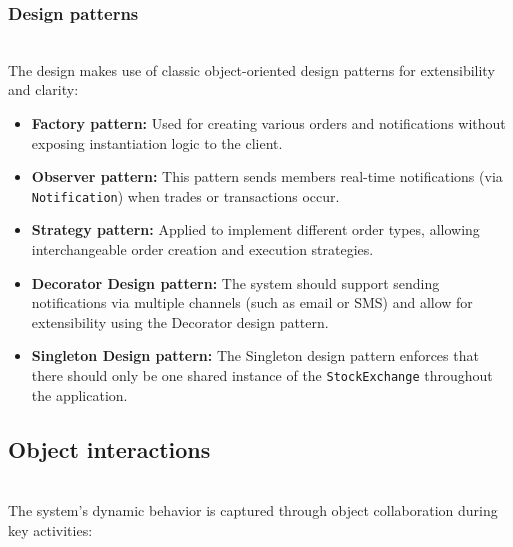 \subsubsection{Design patterns}\label{TQ2PkvirYm4pmg-iTSis4}
\\
The design makes use of classic object-oriented design patterns for extensibility and clarity:

\begin{itemize}
\item
\protect{}\label{kMVpgFRwx3l7-ut_W5-i6}
\textbf{Factory pattern:} Used for creating various orders and notifications without exposing instantiation logic to the client.
\item
\protect{}\label{Vf9d89DGyWcKexO5bI2GL}
\textbf{Observer pattern:} This pattern sends members real-time notifications (via \texttt{Notification}) when trades or transactions occur.
\item
\protect{}\label{9u830rBAhXksxnyIVDm6t}
\textbf{Strategy pattern:} Applied to implement different order types, allowing interchangeable order creation and execution strategies.
\item
\protect{}\label{n7pGeYpQX3ykdIqagFaPp}
\textbf{Decorator Design pattern:} The system should support sending notifications via multiple channels (such as email or SMS) and allow for extensibility using the Decorator design pattern.
\item
\protect{}\label{jeyIGvyA0hnIKbH-wybI_}
\textbf{Singleton Design pattern:} The Singleton design pattern enforces that there should only be one shared instance of the \texttt{StockExchange} throughout the application.
\end{itemize}

\subsection{Object interactions}\label{oYuV_Td9YwffO0rV_G0PT}
\\
The system's dynamic behavior is captured through object collaboration during key activities:

